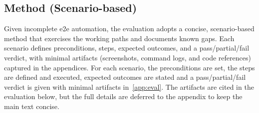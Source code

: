 \documentclass[11pt, a4paper, oneside, listof=totoc]{scrartcl}
\begin{document}
        \subsection{Method (Scenario-based)}\label{subsec:evalMethod}
            Given incomplete \gls{e2e} automation, the evaluation adopts a concise, scenario-based
            method that exercises the working paths and documents known gaps.
            Each scenario defines preconditions, steps, expected outcomes, and a pass/partial/fail
            verdict, with minimal artifacts (screenshots, command logs, and code references)
            captured in the appendices.
            For each scenario, the preconditions are set, the steps are defined and executed,
            expected outcomes are stated and a pass/partial/fail verdict is given with minimal
            artifacts in~\autoref{app:eval}.
            The artifacts are cited in the evaluation below, but the full details are deferred to
            the appendix to keep the main text concise.\\
\end{document}
